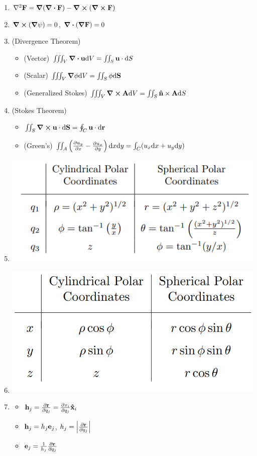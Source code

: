 \documentclass{article}
\theoremstyle{remark}
\theoremstyle{remark}
\begin{document}
\begin{enumerate}
        \item $\laplacian\vb{F}=\grad(\div\vb{F})-\curl(\curl\vb{F}) $
        \item $\curl(\grad\psi) = 0 $, $\div(\grad\vb{F}) = 0 $
        \item (Divergence Theorem) \begin{itemize}
            \item (Vector) $\iiint_{V}\div\vb{u}\dd V=\iint_{S}\vb{u}\cdot\dd {S} $
            \item (Scalar) $\iiint_{V}\grad\phi\dd V=\iint_{S}\phi\dd \vb{S} $
            \item (Generalized Stokes) $\iiint_{V}\curl\vb{A}\dd V = \iint_{S}\vb{\hat n}\times\vb{A}\dd S $
        \end{itemize}
        \item (Stokes Theorem) \begin{itemize}
            \item $\iint_{S}\curl\vb{u}\cdot\dd \vb{S} = \oint_{C}\vb{u}\cdot\dd\vb{r} $
            \item (Green's) $\iint_A\left(\pdv{u_y}{x}-\pdv{u_x}{y}\right)\dd x\dd y = \int_C(u_x\dd x+u_y\dd y) $
        \end{itemize}
        \item \includegraphics*[width=0.5\linewidth]{Curvilinear Coordinates.png}
        \item \includegraphics*[width=0.5\linewidth]{Curvilinear Coordinates2.png}
        \item \begin{itemize}
            \item $\vb{h}_j = \pdv{\vb{r}}{q_j} = \pdv{x_i}{q_j}\vb{\hat x}_i $
            \item $\vb{h}_j = h_j\vb{e}_j $, $h_j = \left|\pdv{\vb{r}}{q_j}\right| $
            \item $\vb{e}_j = \frac{1}{h_j}\pdv{\vb{r}}{q_j} $

\end{itemize}
\end{enumerate}
\end{document}
